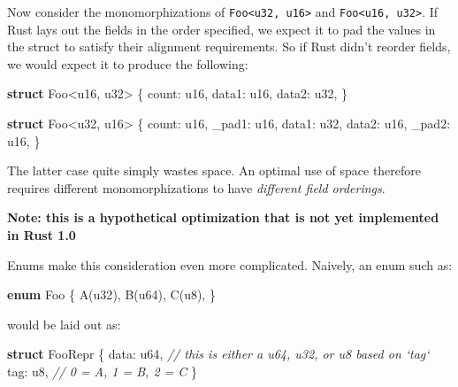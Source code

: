 \documentclass[a4paper,]{book}
\newenvironment{Shaded}{\begin{snugshade}}{\end{snugshade}}
\newcommand{\KeywordTok}[1]{\textcolor[rgb]{0.13,0.29,0.53}{\textbf{{#1}}}}
\newcommand{\DataTypeTok}[1]{\textcolor[rgb]{0.13,0.29,0.53}{{#1}}}
\newcommand{\CommentTok}[1]{\textcolor[rgb]{0.56,0.35,0.01}{\textit{{#1}}}}
\newcommand{\NormalTok}[1]{{#1}}
\begin{document}
Now consider the monomorphizations of
\texttt{Foo\textless{}u32,\ u16\textgreater{}} and
\texttt{Foo\textless{}u16,\ u32\textgreater{}}. If Rust lays out the
fields in the order specified, we expect it to pad the values in the
struct to satisfy their alignment requirements. So if Rust didn't
reorder fields, we would expect it to produce the following:

\begin{Shaded}
\begin{Highlighting}[]
\KeywordTok{struct} \NormalTok{Foo<}\DataTypeTok{u16}\NormalTok{, }\DataTypeTok{u32}\NormalTok{> \{}
    \NormalTok{count: }\DataTypeTok{u16}\NormalTok{,}
    \NormalTok{data1: }\DataTypeTok{u16}\NormalTok{,}
    \NormalTok{data2: }\DataTypeTok{u32}\NormalTok{,}
\NormalTok{\}}

\KeywordTok{struct} \NormalTok{Foo<}\DataTypeTok{u32}\NormalTok{, }\DataTypeTok{u16}\NormalTok{> \{}
    \NormalTok{count: }\DataTypeTok{u16}\NormalTok{,}
    \NormalTok{_pad1: }\DataTypeTok{u16}\NormalTok{,}
    \NormalTok{data1: }\DataTypeTok{u32}\NormalTok{,}
    \NormalTok{data2: }\DataTypeTok{u16}\NormalTok{,}
    \NormalTok{_pad2: }\DataTypeTok{u16}\NormalTok{,}
\NormalTok{\}}
\end{Highlighting}
\end{Shaded}

The latter case quite simply wastes space. An optimal use of space
therefore requires different monomorphizations to have \emph{different
field orderings}.

\textbf{Note: this is a hypothetical optimization that is not yet
implemented in Rust 1.0}

Enums make this consideration even more complicated. Naively, an enum
such as:

\begin{Shaded}
\begin{Highlighting}[]
\KeywordTok{enum} \NormalTok{Foo \{}
    \NormalTok{A(}\DataTypeTok{u32}\NormalTok{),}
    \NormalTok{B(}\DataTypeTok{u64}\NormalTok{),}
    \NormalTok{C(}\DataTypeTok{u8}\NormalTok{),}
\NormalTok{\}}
\end{Highlighting}
\end{Shaded}

would be laid out as:

\begin{Shaded}
\begin{Highlighting}[]
\KeywordTok{struct} \NormalTok{FooRepr \{}
    \NormalTok{data: }\DataTypeTok{u64}\NormalTok{, }\CommentTok{// this is either a u64, u32, or u8 based on `tag`}
    \NormalTok{tag: }\DataTypeTok{u8}\NormalTok{,   }\CommentTok{// 0 = A, 1 = B, 2 = C}
\NormalTok{\}}
\end{Highlighting}
\end{Shaded}
\end{document}
